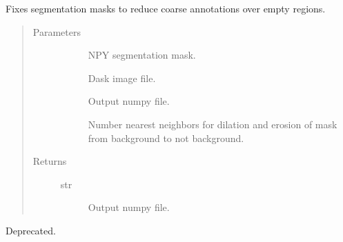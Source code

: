 \documentclass[letterpaper,10pt,english]{sphinxmanual}
\begin{document}
\begin{fulllineitems}
\label{\detokenize{index:pathflowai.utils.adjust_mask}}
Fixes segmentation masks to reduce coarse annotations over empty regions.
\begin{quote}\begin{description}
\item[{Parameters}] \leavevmode\begin{description}
\item[{}] \leavevmode
NPY segmentation mask.

\item[{}] \leavevmode
Dask image file.

\item[{}] \leavevmode
Output numpy file.

\item[{}] \leavevmode
Number nearest neighbors for dilation and erosion of mask from background to not background.

\end{description}

\item[{Returns}] \leavevmode\begin{description}
\item[{str}] \leavevmode
Output numpy file.

\end{description}

\end{description}\end{quote}

\end{fulllineitems}


\begin{fulllineitems}
\label{\detokenize{index:pathflowai.utils.boxes2interior}}
Deprecated.

\end{fulllineitems}
\end{document}
